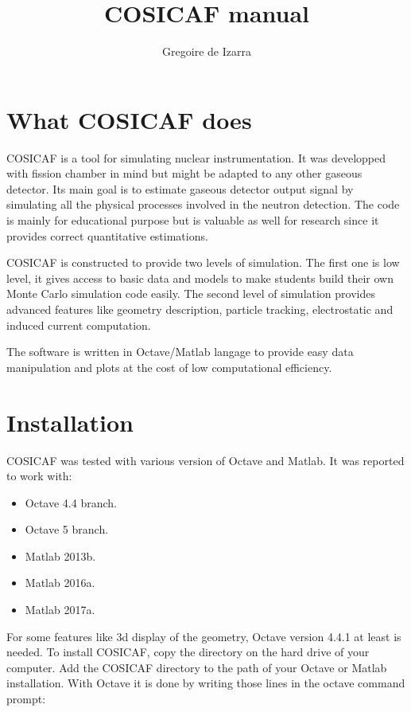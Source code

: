 \documentclass[10pt]{article}
\title{COSICAF manual}
\author{Gregoire de Izarra}
\begin{document}
	\maketitle
	
	\tableofcontents
	\newpage
	\section{What COSICAF does}
	
	COSICAF is a tool for simulating nuclear instrumentation. It was developped with
	fission chamber in mind but might be adapted to any other gaseous detector.
	Its main goal is to estimate gaseous detector output signal by simulating all
	the physical processes involved in the neutron detection.
	The code is mainly for educational purpose but is valuable as well for research
	since it provides correct quantitative estimations.
	
	COSICAF is constructed to provide two levels of simulation. The first one is low
	level, it gives access to basic data and models to make students build their own
	Monte Carlo simulation code easily. The second level of simulation provides
	advanced  features like geometry description, particle tracking, electrostatic
	and induced current computation. 
	
	The software is written in Octave/Matlab langage to provide easy data manipulation
	and plots at the cost of low computational efficiency. 
	
	\section{Installation}
	
	COSICAF was tested with various version of Octave and Matlab. It was reported to work with:
	
	\begin{itemize}
		\item Octave 4.4 branch.
		\item Octave 5 branch.
		\item Matlab 2013b.
		\item Matlab 2016a.
		\item Matlab 2017a.  
	\end{itemize}
	
	 For some features like 3d display of the geometry, Octave version 4.4.1  at least is needed.
	 To install COSICAF, copy the directory on the hard drive of your computer. Add the COSICAF directory to the path of your Octave or Matlab installation. With Octave it is done by writing those lines in the octave command prompt:
	 
\end{document}
